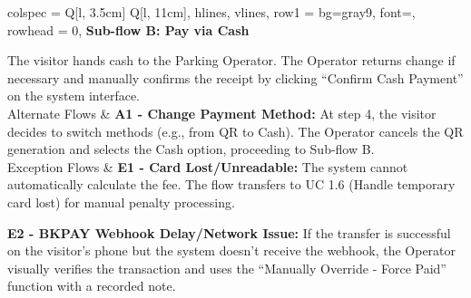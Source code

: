 \begin{longtblr}[
  caption = {UC 3.2: Pay temporary visitor fee},
]{
  colspec = {Q[l, 3.5cm] Q[l, 11cm]}, 
  hlines, vlines,
  row{1} = {bg=gray9, font=\bfseries}, 
  rowhead = 0, 
}
\textbf{Sub-flow B: Pay via Cash} \par
The visitor hands cash to the Parking Operator. The Operator returns change if necessary and manually confirms the receipt by clicking ``Confirm Cash Payment'' on the system interface. \\
Alternate Flows & 
\textbf{A1 - Change Payment Method:} At step 4, the visitor decides to switch methods (e.g., from QR to Cash). The Operator cancels the QR generation and selects the Cash option, proceeding to Sub-flow B. \\
Exception Flows & 
\textbf{E1 - Card Lost/Unreadable:} The system cannot automatically calculate the fee. The flow transfers to UC 1.6 (Handle temporary card lost) for manual penalty processing. \par \vspace{0.5em}
\textbf{E2 - BKPAY Webhook Delay/Network Issue:} If the transfer is successful on the visitor's phone but the system doesn't receive the webhook, the Operator visually verifies the transaction and uses the ``Manually Override - Force Paid'' function with a recorded note. \\
\end{longtblr}